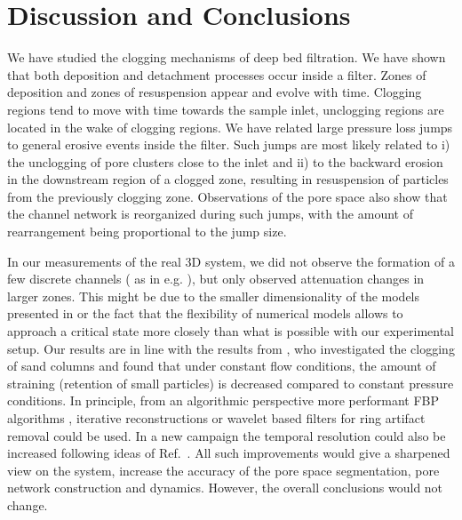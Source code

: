 \documentclass[smallextended]{svjour3}       %
\begin{document}
\section{Discussion and Conclusions}\label{Sec:discuss}
We have studied the clogging mechanisms of deep bed filtration. We have shown that both deposition and detachment processes occur inside a filter. Zones of deposition and zones of resuspension appear and evolve with time. Clogging regions tend to move with time towards the sample inlet, unclogging regions are located in the wake of clogging regions. We have related large pressure loss jumps to general erosive events inside the filter. Such jumps are most likely related to i) the unclogging of pore clusters close to the inlet and ii) to the backward erosion in the downstream region of a clogged zone, resulting in resuspension of particles from the previously clogging zone. Observations of the pore space also show that the channel network is reorganized during such jumps, with the amount of rearrangement being proportional to the jump size.

In our measurements of the real 3D system, we did not observe the formation of a few discrete channels ( as in e.g. \cite{araujo-andrade-2006}), but only observed attenuation changes in larger zones. This might be due to the smaller dimensionality of the models presented in \cite{araujo-andrade-2006} or the fact that the flexibility of numerical models allows to approach a critical state more closely than what is possible with our experimental setup. Our results are in line with the results from \cite{Alem-etal-2015}, who investigated the clogging of sand columns and found that under constant flow conditions, the amount of straining (retention of small particles) is decreased compared to constant pressure conditions. In principle, from an algorithmic perspective more performant FBP algorithms \cite{Kaestner-etal_2016}, iterative reconstructions \cite{Eyndhoven-etal-2015} or wavelet based filters for ring artifact removal \cite{Munch:09} could be used. In a new campaign the temporal resolution could also be increased following ideas of Ref.~\cite{Trtik-etal_2016}. All such improvements would give a sharpened view on the system, increase the accuracy of the pore space segmentation, pore network construction and dynamics. However, the overall conclusions would not change.
\end{document}
